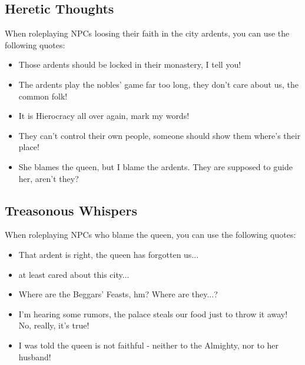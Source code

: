 \subsection{Heretic Thoughts}
\label{ssec:unrestHeretic}

When roleplaying NPCs loosing their faith in the city ardents, you can use the following quotes:

\begin{itemize}
	\item Those ardents should be locked in their monastery, I tell you!
	\item The ardents play the nobles' game far too long, they don't care about us, the common folk!
	\item It is Hierocracy all over again, mark my words!
	\item They can't control their own people, someone should show them where's their place!
	\item She blames the queen, but I blame the ardents. They are supposed to guide her, aren't they?
\end{itemize}

\subsection{Treasonous Whispers}
\label{ssec:unrestTreason}

When roleplaying NPCs who blame the queen, you can use the following quotes:

\begin{itemize}
	\item That ardent is right, the queen has forgotten us...
	\item \npcDeadKing{} at least cared about this city...
	\item Where are the Beggars' Feasts, hm? Where are they...?
	\item I'm hearing some rumors, the palace steals our food just to throw it away! No, really, it's true!
	\item I was told the queen is not faithful - neither to the Almighty, nor to her husband!
\end{itemize}
